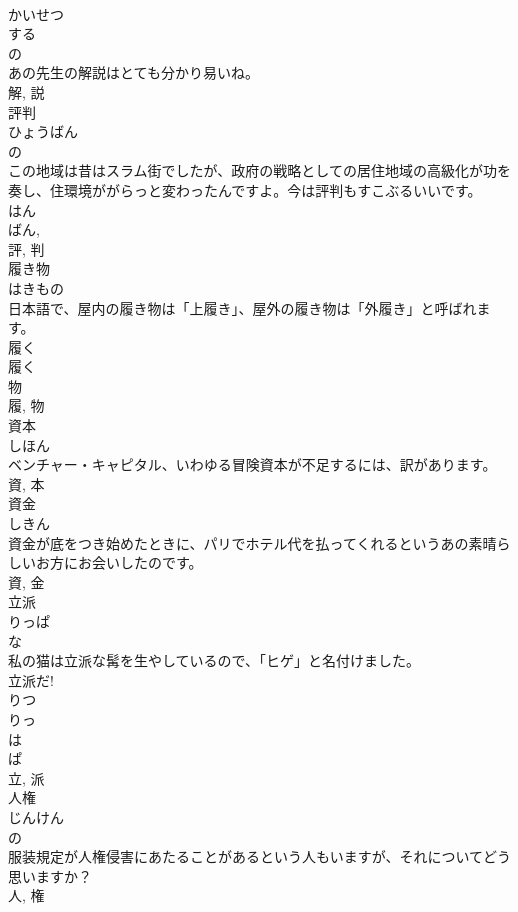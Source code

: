 \documentclass[8pt]{extreport}
\begin{document}
\begin{CJK}{UTF8}{min}
\\	かいせつ	
\\	する 
\\	の 
\\	あの先生の解説はとても分かり易いね。	
\\	解, 説	
\\	評判	
\\	ひょうばん	
\\	の 
\\	この地域は昔はスラム街でしたが、政府の戦略としての居住地域の高級化が功を奏し、住環境ががらっと変わったんですよ。今は評判もすこぶるいいです。	
\\	はん 
\\	ばん, 
\\	評, 判	
\\	履き物	
\\	はきもの	
\\	日本語で、屋内の履き物は「上履き」、屋外の履き物は「外履き」と呼ばれます。	
\\	履く 
\\	履く 
\\	物 
\\	履, 物	
\\	資本	
\\	しほん	
\\	ベンチャー・キャピタル、いわゆる冒険資本が不足するには、訳があります。	
\\	資, 本	
\\	資金	
\\	しきん	
\\	資金が底をつき始めたときに、パリでホテル代を払ってくれるというあの素晴らしいお方にお会いしたのです。	
\\	資, 金	
\\	立派	
\\	りっぱ	
\\	な 
\\	私の猫は立派な髯を生やしているので、「ヒゲ」と名付けました。	
\\	立派だ!	
\\	りつ 
\\	りっ 
\\	は 
\\	ぱ 
\\	立, 派	
\\	人権	
\\	じんけん	
\\	の 
\\	服装規定が人権侵害にあたることがあるという人もいますが、それについてどう思いますか？	
\\	人, 権	

\end{CJK}
\end{document}
